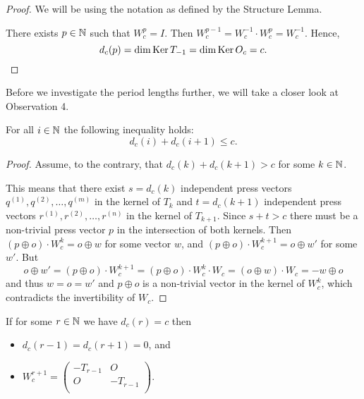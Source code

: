 \begin{proof}
  We will be using the notation as defined by the Structure Lemma.

  There exists $p\in\mathbb{N}$ such that $W_{c}^{p} = I$.
  Then $W_{c}^{p-1} = W_{c}^{-1} \cdot W_{c}^{p} = W_{c}^{-1}$.
  Hence,
  \[
  d_{c}(p)
  =
  \dim\operatorname{Ker} T_{-1}
  =
  \dim\operatorname{Ker} O_{c}
  = c.
  \]
\end{proof}
Before we investigate the period lengths further,
we will take a closer look at Observation 4.

\begin{theorem}[Observation 4]\label{thm:consec}
  For all $i\in\mathbb{N}$ the following inequality holds:
  \[d_{c}(i) + d_{c}(i+1) \leq c.\]
\end{theorem}
\begin{proof}
  Assume, to the contrary, that $d_{c}(k) + d_{c}(k+1) > c$ for some $k\in\mathbb{N}$.

  This means that there exist $s=d_{c}(k)$ independent press vectors
  $q^{(1)}, q^{(2)}, \ldots, q^{(m)}$ in the kernel of $T_k$ and
  $t = d_{c}(k+1)$ independent press vectors
  $r^{(1)}, r^{(2)}, \ldots, r^{(n)}$ in the kernel of $T_{k+1}$.
  Since $s+t>c$ there must be a non-trivial press vector $p$ in the intersection
  of both kernels. Then $(p\oplus o)\cdot W_c^{k} = o\oplus w$ for
  some vector $w$, and $(p\oplus o)\cdot W_c^{k+1}=o\oplus w'$ for some $w'$.
  But 
  \[ o\oplus w'=(p\oplus o)\cdot W_c^{k+1}=(p\oplus o)\cdot W_c^{k}\cdot W_c=(o\oplus w)\cdot W_c=
   -w\oplus o\]
  and thus $w=o=w'$ and $p\oplus o$ is a non-trivial vector in the kernel
  of $W_c^k$, which contradicts the invertibility of $W_c$.
\end{proof}

\begin{corollary}\label{cor:max}
  If for some $r\in\mathbb{N}$ we have $d_{c}(r) = c$ then
  \begin{itemize}
    \item $d_{c}(r-1) = d_{c}(r+1) = 0$, and
    \item $W_{c}^{r+1} = \left(\begin{smallmatrix} -T_{r-1} & O \\
                                  O & -T_{r-1} \\\end{smallmatrix}\right)$.
  \end{itemize}
\end{corollary}

